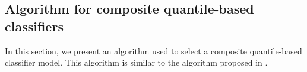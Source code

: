 

\subsection{Algorithm for composite quantile-based classifiers}
\label{sec:classifier-algorithm}

In this section, we present an algorithm used to select a composite
quantile-based classifier model.  This algorithm is similar to the algorithm
proposed in \cite{fan2016}.

